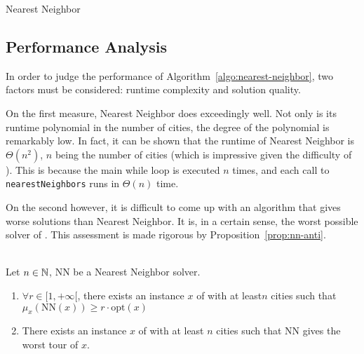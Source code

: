 \begin{algorithm}
    \caption{Nearest Neighbor}
    \label{algo:nearest-neighbor}
     
\end{algorithm}

\subsection{Performance Analysis}

In order to judge the performance of Algorithm~\ref{algo:nearest-neighbor}, two factors must be considered: runtime complexity and solution quality.

On the first measure, Nearest Neighbor does exceedingly well. Not only is its runtime polynomial in the number of cities, the degree of the polynomial is remarkably low. In fact, it can be shown that the runtime of Nearest Neighbor is \(\Theta(n^2)\), \(n\) being the number of cities (which is impressive given the difficulty of \TSP). This is because the main while loop is executed \(n\) times, and each call to \texttt{nearestNeighbors} runs in \(\Theta(n)\) time.

On the second however, it is difficult to come up with an algorithm that gives worse solutions than Nearest Neighbor. It is, in a certain sense, the worst possible solver of \TSP{}. This assessment is made rigorous by Proposition~\ref{prop:nn-anti}.

\begin{proposition}\ \\
    \label{prop:nn-anti}    
    Let \(n\in\mathbb{N}\), NN be a Nearest Neighbor solver.
    \begin{enumerate}[label=(\roman*)]
        \item \(\forall r\in[1, +\infty[\), there exists an instance \(x\) of \TSP{} with  at least\(n\) cities such that \(\mu_x(\mathrm{NN}(x)) \ge r\cdot\mathrm{opt}(x)\) 
        \item There exists an instance \(x\) of \TSP{} with at least \(n\) cities such that NN gives the worst tour of \(x\).
    \end{enumerate}
\end{proposition}

